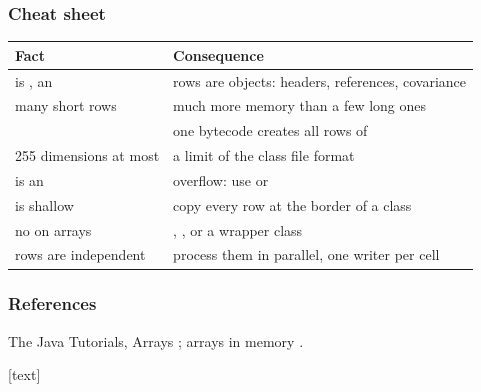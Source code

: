 \documentclass[aspectratio=169,10pt,compress]{beamer}
\begin{document}




\begin{frame}[t,fragile] \frametitle{Cheat sheet}


\begin{table}
		\small
		\begin{tabular}{@{}L{0.32\textwidth}L{0.60\textwidth}@{}}
			\toprule
			\textbf{Fact} & \textbf{Consequence} \\
			\midrule
			 is \hCode{[[I}, an  & rows are objects: headers, references, covariance \\
			many short rows                      & much more memory than a few long ones \\
			               & one bytecode creates all rows of  \\
			255 dimensions at most               & a limit of the class file format \\
			 is an  & overflow: use  or  \\
			 is shallow           & copy every row at the border of a class \\
			no  on arrays          & , , or a wrapper class \\
			rows are independent                 & process them in parallel, one writer per cell \\
			\bottomrule
		\end{tabular}
\end{table}%
\end{frame}




\begin{frame}[t,fragile] \frametitle{References}
	\small The Java Tutorials, Arrays \cite{TheJavaTutorialsArray}; arrays in memory \cite{knuth1973artv1}.

	\vspace{1em}
	[text]
	
	\tiny
\end{frame}




\begin{frame}[t,fragile]
	\begin{center}
		\vspace{4cm}
	\end{center}
\end{frame}
\end{document}
